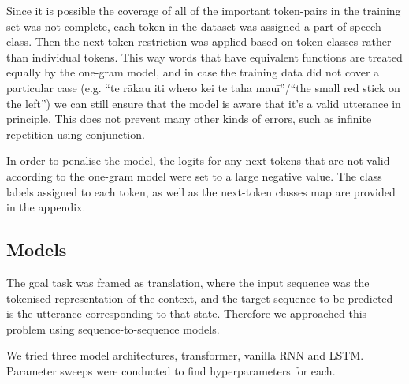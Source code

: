 Since it is possible the coverage of all of the important token-pairs in the training set was not complete, each token in the dataset was assigned a part of speech class. Then the next-token restriction was applied based on token classes rather than individual tokens. This way words that have equivalent functions are treated equally by the one-gram model, and in case the training data did not cover a particular case (e.g. ``te rākau iti whero kei te taha mauī''/``the small red stick on the left'') we can still ensure that the model is aware that it's a valid utterance in principle. This does not prevent many other kinds of errors, such as infinite repetition using conjunction.

In order to penalise the model, the logits for any next-tokens that are not valid according to the one-gram model were set to a large negative value. The class labels assigned to each token, as well as the next-token classes map are provided in the appendix.

\subsection{Models}

The goal task was framed as translation, where the input sequence was the tokenised representation of the context, and the target sequence to be predicted is the utterance corresponding to that state. Therefore we approached this problem using sequence-to-sequence models.

We tried three model architectures, transformer, vanilla RNN and LSTM. Parameter sweeps were conducted to find hyperparameters for each.
